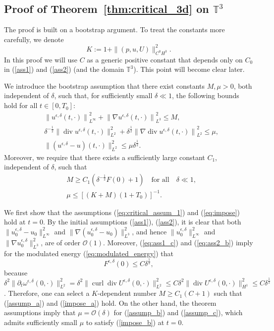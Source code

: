 \documentclass[reqno,10pt]{amsart}
\theoremstyle{definition}
\theoremstyle{remark}
\numberwithin{equation}{section}
\DeclareMathOperator{\dive}{div}
\DeclareMathOperator{\curl}{curl}
\begin{document}
\subsection{Proof of Theorem~\ref{thm:critical_3d} on $\mathbb T^3$} \label{subsec:thm:critical_3d}
The proof is built on a bootstrap argument. To treat the constants more carefully, we denote
\[
    K := 1+\|(p,u,U)\|_{C^0H^3}^2.
\]
In this proof we will use $C$ as a generic positive constant that depends only on $C_0$ in (\ref{ass1}) and (\ref{ass2}) (and the domain $\mathbb T^3$). This point will become clear later.

We introduce the bootstrap assumption that there exist constants $M, \mu>0$, both independent of $\delta$, such that, for sufficiently small $\delta\ll 1$, the following bounds hold for all $t\in[0,T_0]$:
\begin{subequations} \label{eq:critical_assum_1}
\begin{align}
    &{\|u^{\epsilon,\delta}(t,\cdot)\|}_{L^\infty}^2 + {\| \nabla u^{\epsilon,\delta}(t,\cdot)\|}_{L^3}^2 \le M, \label{assump_a} \\
    &\delta^{-\frac{1}{2}}\|\dive u^{\epsilon,\delta}(t,\cdot)\|_{L^2}^2 + \delta^{\frac{1}{2}} {\| \nabla\dive u^{\epsilon,\delta}(t,\cdot)\|}_{L^2}^2 \le \mu, \label{assump_b}\\
    &\|\left(u^{\epsilon,\delta}-u\right)(t,\cdot)\|_{L^2}^2 \le \mu \delta^{\frac{1}{2}}. \label{assump_c}
\end{align}
\end{subequations}
Moreover, we require that there exists a sufficiently large constant $C_1$, independent of $\delta$, such that
\begin{subequations} \label{eq:impose}
\begin{align}
    &M \ge C_1(\delta^{-\frac{1}{2}}F(0)+1) \quad \text{for all} \quad \delta\ll 1, \label{impose_a}\\
    &\mu \le \left[ (K+M)(1+T_0) \right]^{-1}. \label{impose_b}
\end{align}
\end{subequations}

We first show that the assumptions (\ref{eq:critical_assum_1}) and (\ref{eq:impose}) hold at $t=0$. By the initial assumptions (\ref{ass1}), (\ref{ass2}), it is clear that both $\|u^{\epsilon,\delta}_0-u_0\|_{L^\infty}^2$ and $\|\nabla(u^{\epsilon,\delta}_0-u_0)\|_{L^3}^2$, and hence $\|u^{\epsilon,\delta}_0\|_{L^\infty}^2$ and $\|\nabla u^{\epsilon,\delta}_0\|_{L^3}^2$, are of order ${\mathcal O}(1)$. Moreover, (\ref{eq:ass1_c}) and (\ref{eq:ass2_b}) imply for the 
modulated energy (\ref{eq:modulated_energy}) that 
\[ F^{\epsilon,\delta}(0)\le C\delta^{\frac{1}{2}}, \]
because $\delta^2 \|\partial_t \omega^{\epsilon,\delta}(0,\cdot)\|_{L^2}^2 = \delta^2 \|\curl\dive U^{\epsilon,\delta}(0,\cdot)\|_{L^2}^2 \le C\delta^2 \|\dive U^{\epsilon,\delta}(0,\cdot)\|_{H^1}^2 \le C\delta^{\frac{1}{2}}$. Therefore, one can select a $K$-dependent number $M\ge C_1(C+1)$ such that (\ref{assump_a}) and (\ref{impose_a}) hold. On the other hand, the theorem assumptions imply that $\mu={\mathcal O}(\delta)$ for (\ref{assump_b}) and (\ref{assump_c}), which admits sufficiently small $\mu$ to satisfy (\ref{impose_b}) at $t=0$. 
\end{document}
